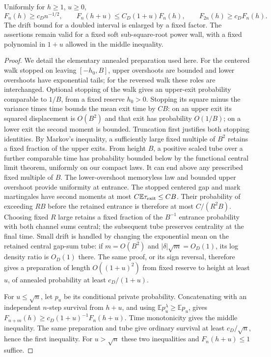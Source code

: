 \begin{lemma}
\label{pr:crude}
Uniformly for $h\ge1$, $u\ge0$,
\begin{equation}
 F_n(h)\ge c_D n^{-1/2},\qquad
 F_n(h+u)\le C_D(1+u)F_n(h),\qquad
 F_{2n}(h)\ge c_D F_n(h).                                 \label{pr:crudeineq}
\end{equation}
The drift bound for a doubled interval is enlarged by a fixed factor.
The assertions remain valid for a fixed soft sub-square-root power wall,
with a fixed polynomial in $1+u$ allowed in the middle inequality.
\end{lemma}
\begin{proof}
We detail the elementary annealed preparation used here. For the centered
walk stopped on leaving $[-h_0,B]$, upper overshoots are bounded and lower
overshoots have exponential tails; for the reversed walk these roles
are interchanged. Optional stopping of the walk gives an upper-exit
probability comparable to $1/B$, from a fixed reserve $h_0>0$.
Stopping its square minus the variance times time bounds the mean exit
time by $C B$: on an upper exit its squared displacement is $O(B^2)$
and that exit has probability $O(1/B)$; on a lower exit the second
moment is bounded. Truncation first justifies both stopping identities.
By Markov's inequality, a sufficiently large fixed multiple of $B^2$
retains a fixed fraction of the upper exits. From height $B$, a positive
scaled tube over a further comparable time has probability bounded below
by the functional central limit theorem, uniformly on our compact laws.
It can end above any prescribed fixed multiple of $B$.
The lower-overshoot memoryless law and bounded upper overshoot provide
uniformity at entrance. The stopped centered gap and mark martingales
have second moments at most $C\mathbb E\tau_{\rm exit}\le CB$.
Their probability of exceeding $RB$ before the retained entrance is
therefore at most $C/(R^2B)$. Choosing fixed $R$ large retains a fixed
fraction of the $B^{-1}$ entrance probability with both channel sums
central; the subsequent tube preserves centrality at the final time.
Small drift is handled by changing the exponential
mean on the retained central gap-sum tube: if $m=O(B^2)$ and
$|\delta|\sqrt m=O_D(1)$, its log density ratio is $O_D(1)$ there.
The same proof, or its sign reversal, therefore gives a preparation of
length $O((1+u)^2)$ from fixed reserve to height at least $u$, of
annealed probability at least $c_D/(1+u)$.

For $u\le\sqrt n$, let $p_u$ be its conditional private probability.
Concatenating with an independent $n$-step survival from $h+u$, and
using $\mathbb E p_u^\lambda\ge\mathbb E p_u$, gives
$F_{n+m}(h)\ge c_D(1+u)^{-1}F_n(h+u)$. Time monotonicity gives the
middle inequality. The same preparation and tube give ordinary survival
at least $c_D/\sqrt n$, hence the first inequality. For $u>\sqrt n$
these two inequalities and $F_n(h+u)\le1$ suffice.


\end{proof}
